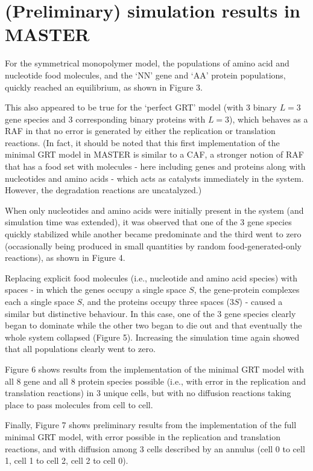 \documentclass{article}
\begin{document}
\section{(Preliminary) simulation results in MASTER}

\normalsize{For the symmetrical monopolymer model, the populations of amino acid and nucleotide food molecules, and the `NN' gene and `AA' protein populations,
quickly reached an equilibrium, as shown in Figure 3.  

This also appeared to be true for the `perfect GRT' model (with 3 binary $L=3$ gene species 
and 3 corresponding binary proteins with $L=3$), which behaves as a RAF in that no error is generated by either the replication or translation reactions. 
(In fact, it should be noted that this first implementation of the minimal GRT model in MASTER is similar to a CAF, a stronger notion of RAF that has a food 
set with molecules - here including genes and proteins along with nucleotides and amino acids - which acts as catalysts immediately in the system.  However, the degradation reactions are uncatalyzed.) 

When only nucleotides and amino acids were initially present in the system (and simulation time was extended), it was observed that one of the 3 gene species quickly stabilized 
while another became predominate and the third went to zero (occasionally being produced in small quantities by random food-generated-only reactions), as shown in Figure 4.

Replacing explicit food molecules (i.e., nucleotide and amino acid species) with spaces - in which the genes occupy a single space $S$, the gene-protein complexes each 
a single space $S$, and the proteins occupy three spaces ($3S$) - caused a similar but distinctive behaviour.  In this case, one of the 3 gene species clearly began to dominate while 
the other two began to die out and that eventually the whole system collapsed (Figure 5).  Increasing the simulation time again showed that all populations 
clearly went to zero.

Figure 6 shows results from the implementation of the minimal GRT model with all 8 gene and all 8 protein species possible (i.e., with error in the replication and translation reactions) in 3 unique cells, but with no diffusion reactions taking place to pass molecules from cell to cell.

Finally, Figure 7 shows preliminary results from the implementation of the full minimal GRT model, with error possible in the replication and translation reactions, and with diffusion among 3 cells described by an annulus (cell 0 to cell 1, cell 1 to cell 2, cell 2 to cell 0).

}
\end{document}

